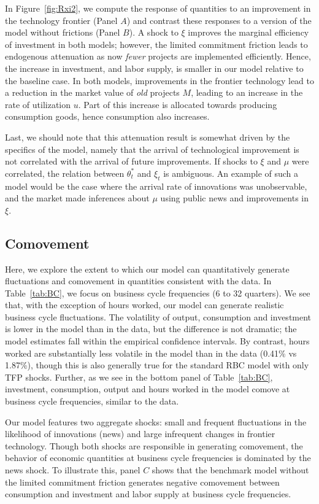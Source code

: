 \documentclass[12pt]{article}
\begin{document}
In Figure~\ref{fig:Rxi2}, we compute the response of quantities to an improvement in the technology frontier (Panel $A$) and contrast these responses to a version of the model without frictions (Panel $B$). A shock to $\xi$ improves the marginal efficiency of investment in both models; however, the limited commitment friction leads to endogenous attenuation as now \emph{fewer} projects are implemented efficiently. Hence, the increase in investment, and labor supply, is smaller in our model relative to the baseline case.  In both models, improvements in the frontier technology lead to a reduction in the market value of \emph{old} projects $M$, leading to an increase in the rate of utilization $u$. Part of this increase is allocated towards producing consumption goods, hence consumption also increases.

Last, we should note that this attenuation result is somewhat driven by the specifics of the model, namely that the arrival of technological improvement is not correlated with the arrival of future improvements. If shocks to $\xi$ and $\mu$ were correlated, the relation between $\theta_t^*$ and $\xi_t$ is ambiguous. An example of such a model would be the case where the arrival rate of innovations was unobservable, and the market made inferences about $\mu$ using public news and improvements in $\xi$.

\subsection{Comovement}

Here, we explore the extent to which our model can quantitatively generate fluctuations and comovement in quantities consistent with the data. In Table~\ref{tab:BC}, we focus on business cycle frequencies (6 to 32 quarters). We see that, with the exception of hours worked, our model can generate realistic business cycle fluctuations. The volatility of output, consumption and investment is lower in the model than in the data, but the difference is not dramatic; the model estimates fall within the empirical confidence intervals. By contrast, hours worked are substantially less volatile in the model than in the data (0.41\% vs 1.87\%), though this is also generally true for the standard RBC model with only TFP shocks. Further, as we see in the bottom panel of Table~\ref{tab:BC}, investment, consumption, output and hours worked in the model comove at business cycle frequencies, similar to the data.

Our model features two aggregate shocks: small and frequent fluctuations in the likelihood of innovations (news) and large infrequent changes in frontier technology. Though both shocks are responsible in generating comovement, the behavior of economic quantities at business cycle frequencies is dominated by the news shock. To illustrate this, panel $C$ shows that the benchmark model without the limited commitment friction generates negative comovement between consumption and  investment and labor supply at business cycle frequencies.
\end{document}
